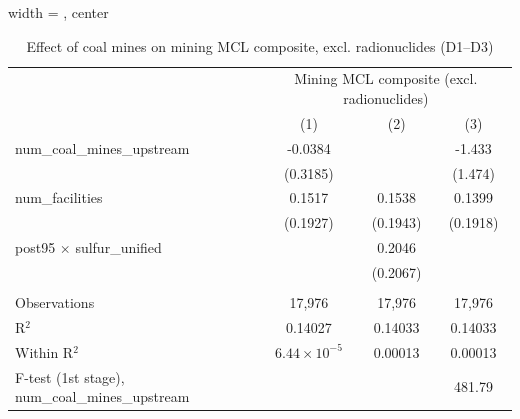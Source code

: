 
\begin{table}[htbp]
   
   \caption{\label{2sls_4step_d1_d3_mining_mcl_norad} Effect of coal mines on mining MCL composite, excl. radionuclides (D1--D3)}
   \bigskip
   
   \centering
   
   \begin{adjustbox}{width = \textwidth, center}
      
      
      \begin{tabular}{lccc}
         \toprule
         
          & \multicolumn{3}{c}{Mining MCL composite (excl. radionuclides)}\\
         
                                                           & (1)                   & (2)           & (3)\\  
         
         \midrule 
         num\_coal\_mines\_upstream                        & -0.0384               &               & -1.433\\   
                                                           & (0.3185)              &               & (1.474)\\   
         num\_facilities                                   & 0.1517                & 0.1538        & 0.1399\\   
                                                           & (0.1927)              & (0.1943)      & (0.1918)\\   
         post95 $\times$ sulfur\_unified                   &                       & 0.2046        &   \\   
                                                           &                       & (0.2067)      &   \\   
         
          \\
         
         Observations                                      & 17,976                & 17,976        & 17,976\\  
         R$^2$                                             & 0.14027               & 0.14033       & 0.14033\\  
         Within R$^2$                                      & $6.44\times 10^{-5}$  & 0.00013       & 0.00013\\  
         F-test (1st stage), num\_coal\_mines\_upstream    &                       &               & 481.79\\  
         

\end{tabular}
\end{adjustbox}
\end{table}
